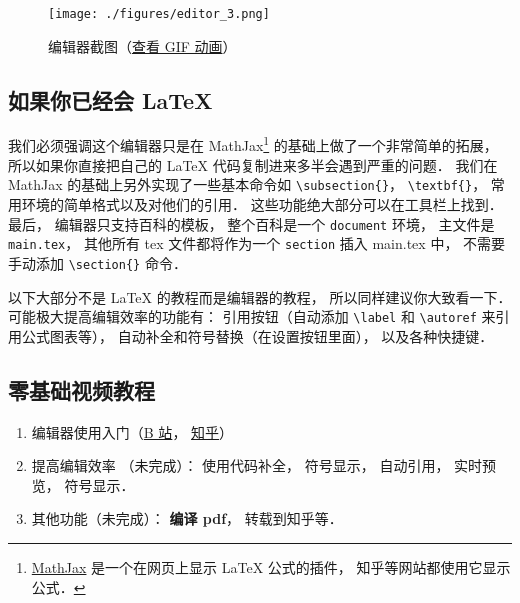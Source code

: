 
\begin{figure}[ht]
\centering
\texttt{[image: ./figures/editor\_3.png]}
\caption{编辑器截图（\href{https://wuli.wiki/apps/editor.gif}{查看 GIF 动画}）} \label{editor_fig3}
\end{figure}

\subsection{如果你已经会 LaTeX}
我们必须强调这个编辑器只是在 MathJax\footnote{\href{https://www.mathjax.org/}{MathJax} 是一个在网页上显示 LaTeX 公式的插件， 知乎等网站都使用它显示公式．} 的基础上做了一个非常简单的拓展， 所以如果你直接把自己的 LaTeX 代码复制进来多半会遇到严重的问题． 我们在 MathJax 的基础上另外实现了一些基本命令如 \verb|\subsection{}|， \verb|\textbf{}|， 常用环境的简单格式以及对他们的引用． 这些功能绝大部分可以在工具栏上找到． 最后， 编辑器只支持百科的模板， 整个百科是一个 \verb|document| 环境， 主文件是 \verb|main.tex|， 其他所有 tex 文件都将作为一个 \verb|section| 插入 main.tex 中， 不需要手动添加 \verb|\section{}| 命令．

以下大部分不是 LaTeX 的教程而是编辑器的教程， 所以同样建议你大致看一下． 可能极大提高编辑效率的功能有： 引用按钮（自动添加 \verb|\label| 和 \verb|\autoref| 来引用公式图表等）， 自动补全和符号替换（在设置按钮里面）， 以及各种快捷键．

\subsection{零基础视频教程}
\begin{enumerate}
\item 编辑器使用入门（\href{https://www.bilibili.com/video/av87698355/}{B 站}， \href{https://zhuanlan.zhihu.com/p/105869878}{知乎}）
\item 提高编辑效率 （未完成）： 使用代码补全， 符号显示， 自动引用， 实时预览， 符号显示．
\item 其他功能（未完成）： \textbf{编译 pdf}， 转载到知乎等．
\end{enumerate}

